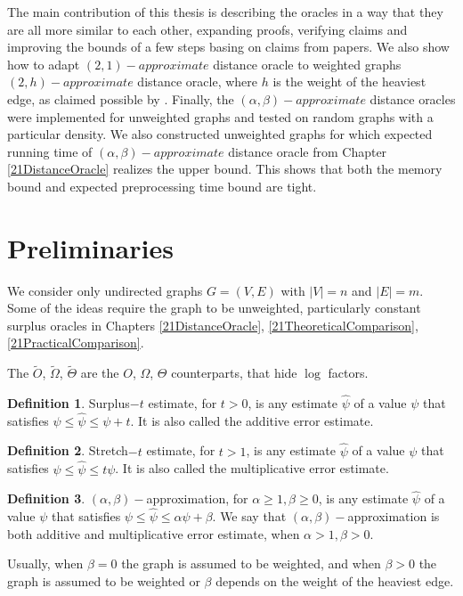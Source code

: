 \documentclass[shortabstract, lic, english]{iithesis}
\theoremstyle{definition} \newtheorem{definition}{Definition}[chapter]
\theoremstyle{plain} \newtheorem{remark}[definition]{Observation}
\theoremstyle{plain} \newtheorem{theorem}[definition]{Theorem}
\theoremstyle{plain} \newtheorem{lemma}[definition]{Lemma}
\theoremstyle{plain} \newtheorem{conjecture}[definition]{Conjecture}
\begin{document}
The main contribution of this thesis is describing the oracles \cite{a0OraclesBasic, 21OracleBasic, 21OracleLessMemory} in a way that they are all more similar to each other,
expanding proofs, verifying claims and improving the bounds of a few steps basing on claims from papers.
We also show how to adapt $(2,1)-approximate$ distance oracle to weighted graphs $(2, h)-approximate$ distance oracle, where $h$ is the weight of the heaviest edge, as claimed possible by \cite{21OracleSpannerNoPenalty}.
Finally, the $(\alpha, \beta)-approximate$ distance oracles were implemented for unweighted graphs and tested on random graphs with a particular density. We also constructed unweighted graphs
for which expected running time of $(\alpha, \beta)-approximate$ distance oracle from Chapter \ref{21DistanceOracle} realizes the upper bound. This shows that both the memory bound and expected preprocessing time bound are tight.

\section{Preliminaries}
We consider only undirected graphs $G = (V, E)$ with $|V| = n$ and $|E| = m$. Some of the ideas require the graph to be unweighted,
particularly constant surplus oracles in Chapters \ref{21DistanceOracle}, \ref{21TheoreticalComparison}, \ref{21PracticalComparison}.

The $\tilde{O}$, $\tilde{\Omega}$, $\tilde{\Theta}$ are the $O$, $\Omega$, $\Theta$ counterparts, that hide $\log$ factors.

\begin{definition}
    Surplus$-t$ estimate, for $t>0$, is any estimate $\hat{\psi}$ of a value $\psi$ that satisfies $\psi \leq \hat{\psi} \leq \psi + t$.
    It is also called the additive error estimate.
\end{definition}

\begin{definition}
    Stretch$-t$ estimate, for $t>1$, is any estimate $\hat{\psi}$ of a value $\psi$ that satisfies $\psi \leq \hat{\psi} \leq t\psi$.
    It is also called the multiplicative error estimate.
\end{definition}

\begin{definition}
    $(\alpha, \beta)-$approximation, for $\alpha \geq 1, \beta \geq 0$, is any estimate $\hat{\psi}$ of a value $\psi$ that satisfies $\psi \leq \hat{\psi} \leq \alpha\psi + \beta$.
    We say that $(\alpha, \beta)-$approximation is both additive and multiplicative error estimate, when $\alpha > 1, \beta > 0$.
\end{definition}
    Usually, when $\beta = 0$ the graph is assumed to be weighted, and when $\beta > 0$ the graph is assumed to be weighted or $\beta$ depends on the weight of the heaviest edge.
\end{document}
